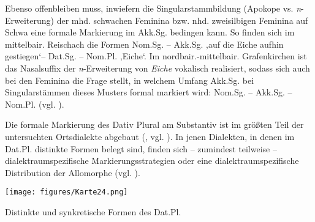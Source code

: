 Ebenso offenbleiben muss, inwiefern die Singularstammbildung (Apokope vs. \textit{n}{}-Erweiterung) der mhd. schwachen Feminina bzw. nhd. zweisilbigen Feminina auf Schwa eine formale Markierung im Akk.Sg. bedingen kann. So finden sich im mittelbair. Reischach die Formen Nom.Sg.  -- Akk.Sg.     ‚auf die Eiche aufhin gestiegen‘-- Dat.Sg.    -- Nom.Pl.  ‚Eiche‘. Im nordbair.-mittelbair. Grafenkirchen ist das Nasalsuffix der \textit{n}{}-Erweiterung von \textit{Eiche} vokalisch realisiert, sodass sich auch bei den Feminina die Frage stellt, in welchem Umfang Akk.Sg. bei Singularstämmen dieses Musters formal markiert wird: Nom.Sg.  -- Akk.Sg.     -- Nom.Pl.  (vgl. ).

Die formale Markierung des Dativ Plural am Substantiv ist im größten Teil der untersuchten Ortsdialekte abgebaut (, vgl. \citealt[Karte 24]{SMF7}). In jenen Dialekten, in denen im Dat.Pl. distinkte Formen belegt sind, finden sich -- zumindest teilweise -- dialektraumspezifische Markierungsstrategien oder eine dialektraumspezifische Distribution der Allomorphe (vgl. \citealt[139--143 und Karten 26, 35]{Rowley1997}).

\vfill
\begin{map}[H]
\texttt{[image: figures/Karte24.png]}
\caption{Distinkte und synkretische Formen des Dat.Pl.}
\label{map:24}
\end{map}
\vfill\pagebreak

